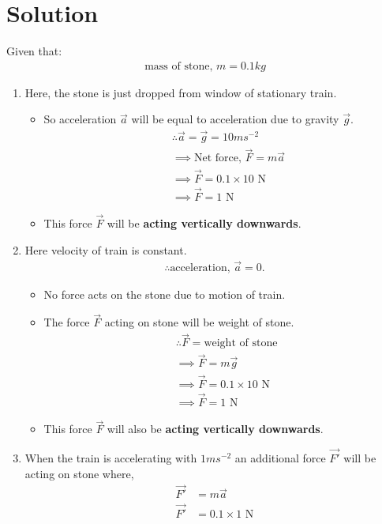 \documentclass[journal,12pt,twocolumn]{IEEEtran}
\begin{document}
\section{Solution}
Given that:
\begin{align}
   \text{mass of stone, }m=0.1 kg
\end{align}
\begin{enumerate}[label=\alph*.)]
\item Here, the stone is just dropped from window of stationary train. 
\begin{itemize}
    \item So acceleration $\vec{a}$ will be equal to acceleration due to gravity $\vec{g}$.
\begin{align}
&\therefore \vec{a} =\vec{g}=10 ms^{-2} 
\\
&\implies \text{Net force, }\vec{F}=m\vec{a}
\\
&\implies \vec{F}=0.1\times10 \text{ N}
\\
&\implies \vec{F}=1\text{ N}
\end{align}
\item This force $\vec{F}$ will be \textbf{acting vertically downwards}.
\end{itemize}
\item Here velocity of train is constant.
\begin{align}
\therefore \text{acceleration, } \vec{a} =0.    
\end{align}
\begin{itemize}
\item No force acts on the stone due to motion of train.
\item The force $\vec{F}$ acting on stone will be weight of stone.
\begin{align}
&\therefore \vec{F} =\text{weight of stone }
\\
&\implies \vec{F}=m\vec{g}
\\
&\implies \vec{F}=0.1\times10 \text{ N}
\\
&\implies \vec{F}=1\text{ N}
\end{align}
\item This force $\vec{F}$ will also be \textbf{acting vertically downwards}.
\end{itemize}
\item When the train is accelerating with $1 ms^{-2}$ an additional force $\vec{F'}$ will be acting on stone where,
\begin{align}
 \vec{F'}&=m\vec{a}
 \\
 \vec{F'}&=0.1\times1\text{ N}

\end{align}
\end{enumerate}
\end{document}
